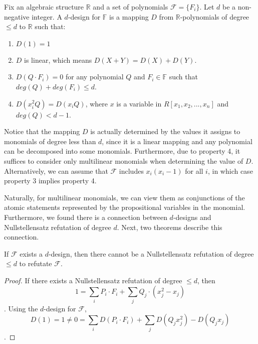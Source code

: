\documentclass{article}
\begin{document}
\else
\fi

\begin{Define}
\begin{define}
  Fix an algebraic structure $\mathbb{R}$ and a set of polynomials $\mathcal{F} = \{F_i\}.$ Let $d$ be a non-negative integer. A $d$-design for $\mathbb{F}$ is a mapping $D$ from $\mathbb{R}$-polynomials of degree $\leq d$ to $\mathbb{R}$ such that:
  \begin{enumerate}
  \item $D(1) = 1$
  \item $D$ is linear, which means $D(X + Y) = D(X) + D(Y)$.
  \item $D(Q\cdot F_i) = 0$ for any polynomial $Q$ and $F_i \in \mathbb{F}$ such that $deg(Q) + deg(F_i) \leq d$.
  \item $D(x_i^2Q) = D(x_iQ)$, where $x$ is a variable in $R[x_1, x_2, ..., x_n]$ and $deg(Q) < d-1$.    
  \end{enumerate}
\end{define}
\end{Define}

Notice that the mapping $D$ is actually determined by the values it assigns to monomials of degree less than $d$, since it is a linear mapping and any polynomial can be decomposed into some monomials. Furthermore, due to property 4, it suffices to consider only multilinear monomials when determining the value of $D$. Alternatively, we can assume that $\mathcal{F}$ includes $x_i(x_i-1)$ for all $i$, in which case property 3 implies property 4.

Naturally, for multilinear monomials, we can view them as conjunctions of the atomic statements represented by the propositional variables in the monomial. Furthermore, we found there is a connection between $d$-designs and Nullstellensatz refutation of degree $d$. Next, two theorems describe this connection.

\begin{Theorem}
  \begin{theorem}
    If $\mathcal{F}$ exists a $d$-design, then there cannot be a Nullstellensatz refutation of degree $\leq d$ to refutate $\mathcal{F}$.
  \end{theorem}
\end{Theorem}

\begin{Proof}
  \begin{proof}
    If there exists a Nullstellensatz refutation of degree $\leq d$, then $$1 = \sum_i P_i\cdot F_i + \sum_j Q_j\cdot (x_j^2 - x_j)$$. Using the $d$-design for $\mathcal{F}$, $$D(1) = 1 \neq 0 = \sum_i D(P_i \cdot F_i) + \sum_j D(Q_jx_j^2) - D(Q_jx_j)$$.
  \end{proof}
\end{Proof}
\end{document}

